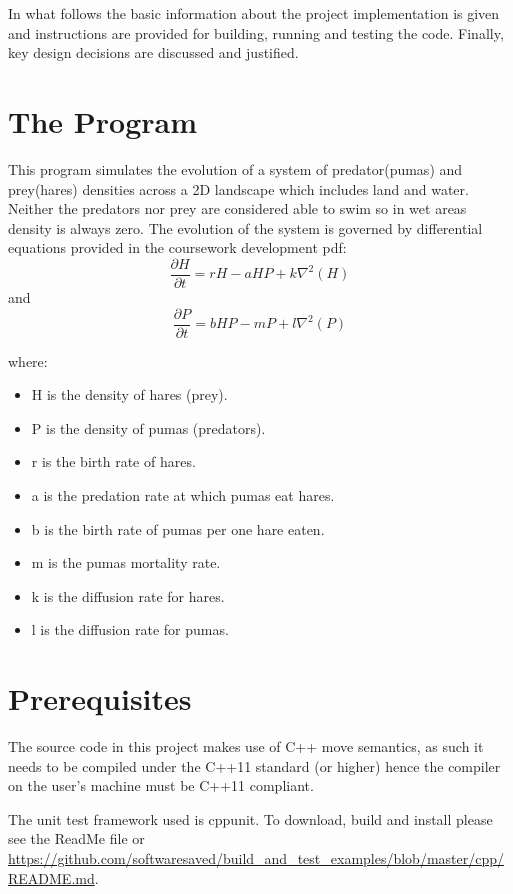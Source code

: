In what follows the basic information about the project implementation is given and instructions are provided for building, running and testing the code. Finally, key design decisions are discussed and justified.

\section{The Program}
This program simulates the evolution of a system of predator(pumas) and prey(hares) densities across a 2D landscape which includes land and water. Neither the predators nor prey are considered able to swim so in wet areas density is always zero. The evolution of the system is governed by differential equations provided in the coursework development pdf:
\begin{equation}
\frac{\partial H}{\partial t} = rH - aHP + k\nabla^2(H)
\end{equation}
and
\begin{equation}
\frac{\partial P}{\partial t} = bHP - mP + l\nabla^2(P)
\end{equation}

where: 
\begin{itemize}
\item H is the density of hares (prey).
\item P is the density of pumas (predators).
\item r is the birth rate of hares.
\item a is the predation rate at which pumas eat hares.
\item b is the birth rate of pumas per one hare eaten.
\item m is the pumas mortality rate.
\item k is the diffusion rate for hares. 
\item l is the diffusion rate for pumas.
\end{itemize}

\section{Prerequisites}
The source code in this project makes use of C++ move semantics, as such it needs to be compiled under the C++11 standard (or higher) hence the compiler on the user's machine must be C++11 compliant. 

The unit test framework used is cppunit. To download, build and install please see the ReadMe file or \url{https://github.com/softwaresaved/build_and_test_examples/blob/master/cpp/README.md}.

